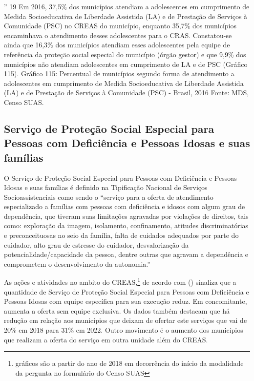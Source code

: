 \documentclass[
  brazilian]{report}
\begin{document}
'' 19 Em 2016, 37,5\% dos municípios atendiam a adolescentes em
cumprimento de Medida Socioeducativa de Liberdade Assistida (LA) e de
Prestação de Serviços à Comunidade (PSC) no CREAS do município, enquanto
35,7\% dos municípios encaminhava o atendimento desses adolescentes para
o CRAS. Constatou-se ainda que 16,3\% dos municípios atendiam esses
adolescentes pela equipe de referência da proteção social especial do
município (órgão gestor) e que 9,9\% dos municípios não atendiam
adolescentes em cumprimento de LA e de PSC (Gráfico 115). Gráfico 115:
Percentual de municípios segundo forma de atendimento a adolescentes em
cumprimento de Medida Socioeducativa de Liberdade Assistida (LA) e de
Prestação de Serviços à Comunidade (PSC) - Brasil, 2016 Fonte: MDS,
Censo SUAS.

\hypertarget{serviuxe7o-de-proteuxe7uxe3o-social-especial-para-pessoas-com-deficiuxeancia-e-pessoas-idosas-e-suas-famuxedlias}{%
\subsection{Serviço de Proteção Social Especial para Pessoas com
Deficiência e Pessoas Idosas e suas
famílias}\label{serviuxe7o-de-proteuxe7uxe3o-social-especial-para-pessoas-com-deficiuxeancia-e-pessoas-idosas-e-suas-famuxedlias}}

O Serviço de Proteção Social Especial para Pessoas com Deficiência e
Pessoas Idosas e suas famílias é definido na Tipificação Nacional de
Serviços Socioassistenciais como sendo o ``serviço para a oferta de
atendimento especializado a famílias com pessoas com deficiência e
idosos com algum grau de dependência, que tiveram suas limitações
agravadas por violações de direitos, tais como: exploração da imagem,
isolamento, confinamento, atitudes discriminatórias e preconceituosas no
seio da família, falta de cuidados adequados por parte do cuidador, alto
grau de estresse do cuidador, desvalorização da
potencialidade/capacidade da pessoa, dentre outras que agravam a
dependência e comprometem o desenvolvimento da autonomia.''

As ações e atividades no ambito do
CREAS,\footnote{gráficos são a partir do ano de 2018 em decorrência do início da modalidade da pergunta no formulário do Censo SUAS}
de acordo com () sinaliza que a quantidade
de Serviço de Proteção Social Especial para Pessoas com Deficiência e
Pessoas Idosas com equipe específica para sua execução reduz. Em
concomitante, aumenta a oferta sem equipe exclusiva. Os dados também
destacam que há redução em relação aos municípios que deixam de ofertar
este serviços que vai de 20\% em 2018 para 31\% em 2022. Outro movimento
é o aumento dos municípios que realizam a oferta do serviço em outra
unidade além do CREAS.
\end{document}

